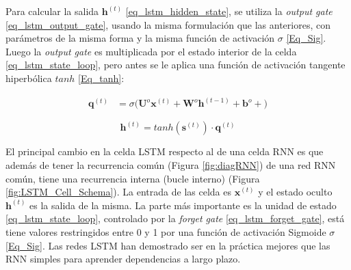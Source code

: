 \documentclass[spanish]{article}
\theoremstyle{definition}
\theoremstyle{remark}
\numberwithin{equation}{section}
\numberwithin{equation}{section} %
\begin{document}
Para calcular la salida $\boldsymbol{h}^{(t)}$ \eqref{eq_lstm_hidden_state}, se utiliza la \textit{output gate} \eqref{eq_lstm_output_gate}, usando la misma formulación que las anteriores, con parámetros de la misma forma y la misma función de activación $\sigma$ \eqref{Eq_Sig}. Luego la \textit{output gate} es multiplicada por el estado interior de la celda \eqref{eq_lstm_state_loop}, pero antes se le aplica una función de activación tangente hiperbólica $tanh$ \eqref{Eq_tanh}:

  \begin{equation}
\label{eq_lstm_output_gate}
\begin{split}
 \boldsymbol{q}^{(t)} & =\sigma \Bigg( \boldsymbol{U}^o \boldsymbol{x}^{(t)} + \boldsymbol{W}^o \boldsymbol{h}^{(t-1)} +\boldsymbol{b}^o+ \Bigg)
 \end{split}{}
 \end{equation} \par
  \begin{equation}
\label{eq_lstm_hidden_state}
 \boldsymbol{h}^{(t)}  =tanh(\boldsymbol{s}^{(t)}) \cdot \boldsymbol{q}^{(t)}
 \end{equation} \par
 El principal cambio en la celda LSTM respecto al de una celda RNN es que además de tener la recurrencia común (Figura \ref{fig:diagRNN}) de una red RNN común, tiene una recurrencia interna (bucle interno) (Figura \ref{fig:LSTM_Cell_Schema}). La entrada de las celda es $\boldsymbol{x}^{(t)}$ y el estado oculto $\boldsymbol{h}^{(t)}$ es la salida de la misma. La parte más importante es la unidad de estado \eqref{eq_lstm_state_loop}, controlado por la \textit{forget gate} \eqref{eq_lstm_forget_gate}, está tiene valores restringidos entre 0 y 1 por una función de activación Sigmoide $\sigma$ \eqref{Eq_Sig}. Las redes LSTM han demostrado ser en la práctica mejores que las RNN simples para aprender dependencias a largo plazo.\par
 
\end{document}
